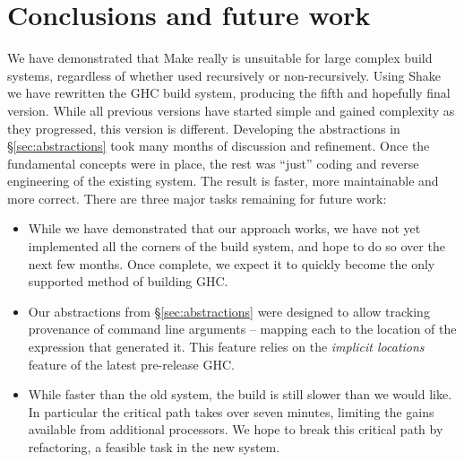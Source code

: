 \section{Conclusions and future work\label{section-conclusions}}

We have demonstrated that Make really is unsuitable for large complex build
systems, regardless of whether used recursively or non-recursively. Using Shake
we have rewritten the GHC build system, producing the fifth and hopefully final
version. While all previous versions have started simple and gained complexity
as they progressed, this version is different. Developing the abstractions in
\S\ref{sec:abstractions} took many months of discussion and refinement. Once the
fundamental concepts were in place, the rest was ``just'' coding and reverse
engineering of the existing system. The result is faster, more maintainable and
more correct. There are three major tasks remaining for future work:

\begin{itemize}
\item While we have demonstrated that our approach works, we have not yet
implemented all the corners of the build system, and hope to do so over the next
few months. Once complete, we expect it to quickly become the only supported
method of building GHC.

\item Our abstractions from \S\ref{sec:abstractions} were designed to allow
tracking provenance of command line arguments -- mapping each to the
location of the expression that generated it. This feature relies on the
\emph{implicit locations} feature of the latest pre-release GHC.

\item While faster than the old system, the build is still slower than we would like. In particular the critical path takes over seven minutes, limiting the gains available from additional processors. We hope to break this critical path by refactoring, a feasible task in the new system.
\end{itemize}
